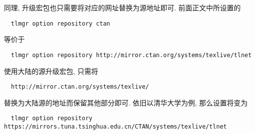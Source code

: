 同理,
升级宏包也只需要将对应的网址替换为源地址即可.
前面正文中所设置的
\begin{lstlisting}
  tlmgr option repository ctan
\end{lstlisting}
等价于
\begin{lstlisting}
  tlmgr option repository http://mirror.ctan.org/systems/texlive/tlnet
\end{lstlisting}
使用大陆的源升级宏包,
只需将
\begin{lstlisting}
  http://mirror.ctan.org/systems/texlive/
\end{lstlisting}
替换为大陆源的地址而保留其他部分即可.
依旧以清华大学为例,
那么设置将变为
\begin{lstlisting}
  tlmgr option repository https://mirrors.tuna.tsinghua.edu.cn/CTAN/systems/texlive/tlnet
\end{lstlisting}
